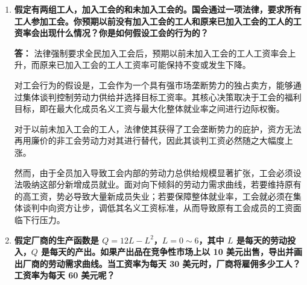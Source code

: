 \begin{enumerate}[label=\textbf{\arabic*.}, leftmargin=*]
		\textbf{答：}
		（1）若计算机内存需求增加，通常意味着下游计算机消费市场的总体需求也出现了同向扩张。如果在最终计算机产品需求保持不变的背景下内存需求依然上升，其合理的替代解释在于，由于组装技术调整或其余元器件（如处理器）的相对价格出现大幅下降，引致了计算机整体供给规模的扩张，从而连带提振了对核心内存要素的派生需求。
		
		（2）航空燃料在民航运输服务中具有极强的不可替代性，其需求上涨往往直接对应着终端旅客对航空出行服务消费的长足增长。如果在民航客运需求维持静态不变的条件下燃料使用量增加，其可能的原因在于其他互补或相关要素（例如空乘地勤人员薪资或机场起降规费）出现下调，降低了航空公司的边际运营成本并促使其增开航线，从而诱发了航空燃料的增量消费。
		
		（3）新闻用纸的需求上涨一般直接映射了报纸及纸质传媒市场订阅需求的景气扩张。若消费端的报纸需求处于完全恒定的状态，则纸张要素引致需求增加的经济学动因在于印刷油墨、报业投递人工等其余协同生产要素的价格发生大幅下跌，这使得报社的供给能力在成本驱动下发生右移，从而在较低的报纸市价下撬动了更多的新闻纸消耗。
		
		（4）饮料罐用铝材引致需求的急剧上升，在通常情况下直接派生于快消品或软饮料消费市场的季节性需求爆发。如果在终端软饮料需求并未发生任何波动的常态下铝材消耗依旧上涨，则最可信的经济学解释包括：一是玻璃、塑料等相互替代的包装容器材料在市场上出现了大幅提价；二是再生铝或新型加工工艺的使用提高了铝罐包装的边际性价比，引发了材料间的跨替代效应。
		
		\item \textbf{假定有两组工人，加入工会的和未加入工会的。国会通过一项法律，要求所有工人参加工会。你预期以前没有加入工会的工人和原来已加入工会的工人的工资率会出现什么情况？你是如何假设工会的行为的？}
		
		\textbf{答：}
		法律强制要求全民加入工会后，预期以前未加入工会的工人工资率会上升，而原来已加入工会的工人工资率可能保持不变或发生下降。
		
		对工会行为的假设是，工会作为一个具有强市场垄断势力的独占卖方，能够通过集体谈判控制劳动力供给并选择目标工资率。其核心决策取决于工会的福利目标，即在最大化成员名义工资与最大化整体就业率之间进行边际权衡。
		
		对于以前未加入工会的工人，法律使其获得了工会垄断势力的庇护，资方无法再用廉价的非工会劳动力对其进行替代，因此其谈判工资必然随之大幅度上涨。
		
		然而，由于全员加入导致工会内部的劳动力总供给规模显著扩张，工会必须设法吸纳这部分新增成员就业。面对向下倾斜的劳动力需求曲线，若要维持原有的高工资，势必导致大量新成员失业；若要保障整体就业率，工会就必须在集体谈判中向资方让步，调低其名义工资标准，从而导致原有工会成员的工资面临下行压力。
		\newpage
		\item \textbf{假定厂商的生产函数是 $Q = 12L - L^2$，$L = 0 \sim 6$，其中 $L$ 是每天的劳动投入，$Q$ 是每天的产出。如果产出品在竞争性市场上以 10 美元出售，导出并画出厂商的劳动需求曲线。当工资率为每天 30 美元时，厂商将雇佣多少工人？工资率为每天 60 美元呢？}
		

\end{enumerate}
